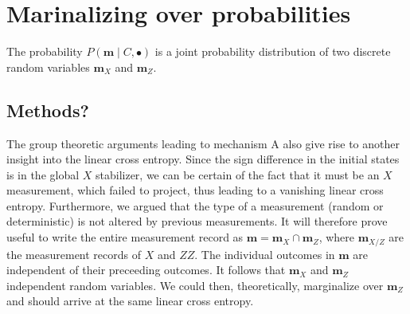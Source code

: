 \section{Marinalizing over probabilities}
The probability $P(\mathbf{m} \mid C, \bullet)$ is a joint probability
distribution of two discrete random variables $\mathbf{m}_X$ and
$\mathbf{m}_Z$. 

\subsection{Methods?}
The group theoretic arguments leading to mechanism \textsf{A} also give rise to
another insight into the linear cross entropy. Since the sign difference in the
initial states is in the global $X$ stabilizer, we can be certain of the fact
that it must be an $X$ measurement, which failed to project, thus leading to a
vanishing linear cross entropy. Furthermore, we argued that the type of a
measurement (random or deterministic) is not altered by previous measurements.
It will therefore prove useful to write the entire measurement record as
$\mathbf{m} = \mathbf{m}_X \cap \mathbf{m}_Z$, where $\mathbf{m}_{X/Z}$ are the
measurement records of $X$ and $ZZ$. The individual outcomes in $\mathbf{m}$
are independent of their preceeding outcomes. It follows that $\mathbf{m}_X$
and $\mathbf{m}_Z$ independent random variables. We could then, theoretically,
marginalize over $\mathbf{m}_Z$ and should arrive at the same linear cross
entropy.

